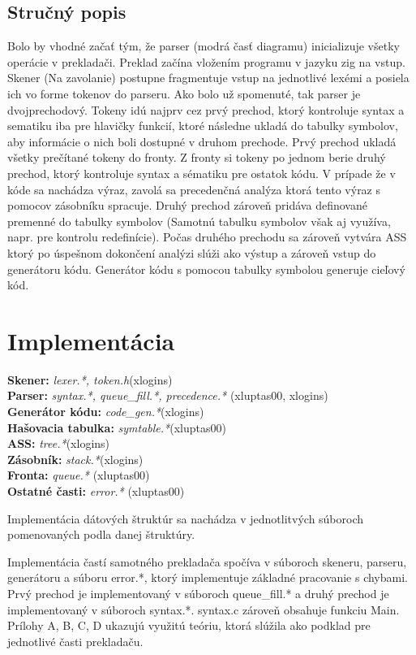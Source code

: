 \documentclass[a4paper, 12pt]{article}
\begin{document}
	\subsection{Stručný popis}
	Bolo by vhodné začať tým, že parser (modrá časť diagramu) inicializuje všetky operácie v prekladači.  
	Preklad začína vložením programu v jazyku zig na
	 vstup. Skener (Na zavolanie) postupne fragmentuje vstup na jednotlivé lexémi a posiela ich vo forme tokenov do parseru.  Ako bolo už spomenuté, tak parser je dvojprechodový. Tokeny idú najprv cez prvý prechod, ktorý kontroluje syntax a sematiku iba pre hlavičky funkcií, ktoré následne ukladá do tabulky symbolov, aby informácie o nich boli dostupné v druhom prechode. Prvý prechod ukladá všetky prečítané tokeny do fronty. Z fronty si tokeny po jednom berie druhý prechod, ktorý kontroluje syntax a sématiku pre ostatok kódu. V prípade že v kóde sa nachádza výraz, zavolá sa precedenčná analýza ktorá tento výraz s pomocov zásobníku spracuje. Druhý prechod zároveň pridáva definované premenné do tabulky symbolov  (Samotnú tabulku symbolov však aj využíva, napr. pre kontrolu redefinície).  Počas druhého prechodu sa zároveň vytvára ASS ktorý po úspešnom dokončení analýzi slúži ako výstup a zároveň vstup do generátoru kódu. Generátor kódu s pomocou tabulky symbolou generuje cieľový kód.
	 	
	\newpage
	\section{Implementácia}
	\textbf{Skener: }\textit{lexer.*, token.h}(xlogins)\\ 
	\textbf{Parser: }\textit{syntax.*, queue\_fill.*, precedence.*} (xluptas00, xlogins)\\
	\textbf{Generátor kódu: }\textit{code\_gen.*}(xlogins)\\
	\textbf{Hašovacia tabulka: }\textit{symtable.*}(xluptas00)\\
	\textbf{ASS: }\textit{tree.*}(xlogins)\\
	\textbf{Zásobník: }\textit{stack.*}(xlogins)\\
	\textbf{Fronta: }\textit{queue.*} (xluptas00)\\
	\textbf{Ostatné časti: }\textit{error.*} (xluptas00)\\
	\par Implementácia dátových štruktúr sa nachádza v jednotlitvých súboroch pomenovaných podla danej štruktúry.
	\par Implementácia častí samotného prekladača spočíva v súboroch skeneru, parseru, generátoru a súboru error.*, ktorý 
	implementuje základné pracovanie s chybami. Prvý prechod je implementovaný v súboroch queue\_fill.* a druhý prechod je
	implementovaný v súboroch syntax.*. syntax.c zároveň obsahuje funkciu Main. Prílohy A, B, C, D ukazujú využitú teóriu, ktorá slúžila ako podklad pre jednotlivé časti prekladaču.
	
\end{document}
